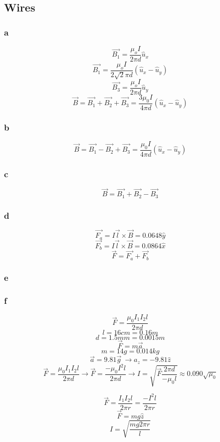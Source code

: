 \subsection{Wires}

\subsubsection{a}
\[\vec{B_1} = \frac{\mu_o I}{2 \pi d} \hat{u}_x\]
\[\vec{B_1} = \frac{\mu_o I}{2 \sqrt{2} \pi d} (\hat{u}_x - \hat{u}_y)\]
\[\vec{B_3} = \frac{\mu_o I}{2 \pi d} \hat{u}_y\]
\[
	\vec{B} = \vec{B_1} + \vec{B_2} + \vec{B_3}
	= \frac{3 \mu_0 I}{4 \pi d} (\hat{u}_x - \hat{u}_y)
\]

\subsubsection{b}
\[
	\vec{B} = \vec{B_1} - \vec{B_2} + \vec{B_3}
	= \frac{\mu_0 I}{4 \pi d} (\hat{u}_x - \hat{u}_y)
\]

\subsubsection{c}
\[
	\vec{B} = \vec{B_1} + \vec{B_2} - \vec{B_3}
\]

\subsubsection{d}
\[
	\vec{F_a} = I \vec{l} \times \vec{B} = 0.0648 \hat{y}
\]
\[
	\vec{F_b} = I \vec{l} \times \vec{B} = 0.0864 \hat{x}
\]
\[
	\vec{F} = \vec{F_a} + \vec{F_b}
\]

\subsubsection{e}

\subsubsection{f}
\[\vec{F} = \frac{\mu_0 I_1 I_2 l}{2 \pi d}\]
\[l = 16 \unit{cm} = 0.16 \unit{m}\]
\[d = 1.5 \unit{mm} = 0.0015 \unit{m}\]
\[\vec{F} = m \vec{a}\]
\[m = 14 \unit{g} = 0.014 \unit{kg}\]
\[\vec{a} = 9.81 \vec{g}\ \to a_z = - 9.81 \hat{z}\]
\[
	\vec{F} = \frac{\mu_0 I_1 I_2 l}{2 \pi d}
	\to \vec{F} = \frac{- \mu_0 I^2 l}{2 \pi d}
	\to I = \sqrt{\vec{F} \frac{2 \pi d}{- \mu_0 l}}
	\approx 0.090 \sqrt{\mu_0}
\]

\[
	\vec{F} = \frac{I_1 I_2 l}{2 \pi r} = \frac{- I^2 l}{2 \pi r}
\]
\[
	\vec{F} = m g \hat{z}
\]
\[
	I = \sqrt{\frac{m g 2 \pi r}{l}}
\]

